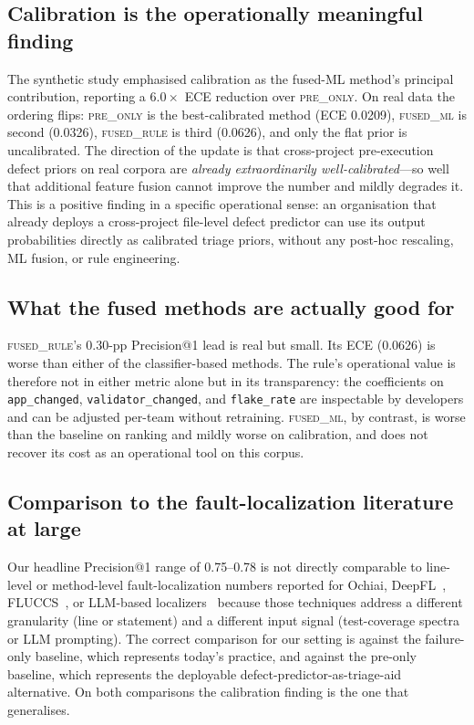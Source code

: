 \documentclass[preprint,12pt]{elsarticle}
\begin{document}
\subsection{Calibration is the operationally meaningful finding}

The synthetic study emphasised calibration as the fused-ML method's principal contribution, reporting a $6.0\times$ ECE reduction over \textsc{pre\_only}. On real data the ordering flips: \textsc{pre\_only} is the best-calibrated method (ECE 0.0209), \textsc{fused\_ml} is second (0.0326), \textsc{fused\_rule} is third (0.0626), and only the flat prior is uncalibrated. The direction of the update is that cross-project pre-execution defect priors on real corpora are \emph{already extraordinarily well-calibrated}---so well that additional feature fusion cannot improve the number and mildly degrades it. This is a positive finding in a specific operational sense: an organisation that already deploys a cross-project file-level defect predictor can use its output probabilities directly as calibrated triage priors, without any post-hoc rescaling, ML fusion, or rule engineering.

\subsection{What the fused methods are actually good for}

\textsc{fused\_rule}'s 0.30-pp Precision@1 lead is real but small. Its ECE (0.0626) is worse than either of the classifier-based methods. The rule's operational value is therefore not in either metric alone but in its transparency: the coefficients on \texttt{app\_changed}, \texttt{validator\_changed}, and \texttt{flake\_rate} are inspectable by developers and can be adjusted per-team without retraining. \textsc{fused\_ml}, by contrast, is worse than the baseline on ranking and mildly worse on calibration, and does not recover its cost as an operational tool on this corpus.

\subsection{Comparison to the fault-localization literature at large}

Our headline Precision@1 range of 0.75--0.78 is not directly comparable to line-level or method-level fault-localization numbers reported for Ochiai, DeepFL~\cite{li2019deepfl}, FLUCCS~\cite{sohn2017fluccs}, or LLM-based localizers~\cite{yang2024llmao,kang2024llmfl,rezaalipour2024pyfl} because those techniques address a different granularity (line or statement) and a different input signal (test-coverage spectra or LLM prompting). The correct comparison for our setting is against the failure-only baseline, which represents today's practice, and against the pre-only baseline, which represents the deployable defect-predictor-as-triage-aid alternative. On both comparisons the calibration finding is the one that generalises.
\end{document}
